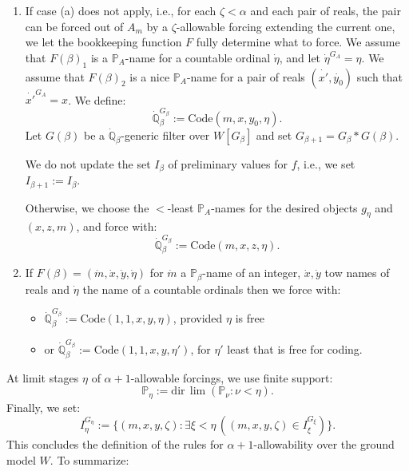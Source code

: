 \documentclass[a4paper,11pt]{article}
\newcommand{\forceP}{\mathbb{P}}
\newcommand{\forceQ}{\mathbb{Q}}
\begin{document}
\begin{enumerate}
\item[(b)] If case (a) does not apply, i.e., for each \( \zeta < \alpha \) and each pair of reals, the pair can be forced out of \( A_m \) by a \( \zeta \)-allowable forcing extending the current one, we let the bookkeeping function \( F \) fully determine what to force. We assume that \( F(\beta)_1 \) is a \( \forceP_A \)-name for a countable ordinal \( \dot{\eta} \), and let \( \dot{\eta}^{G_A} = \eta \). We assume that \( F(\beta)_2 \) is a nice \( \forceP_A \)-name for a pair of reals \( (\dot{x'}, \dot{y_0}) \) such that \( \dot{x'}^{G_A} = x \). We define:
  \[
  \dot{\forceQ}_{\beta}^{G_{\beta}} := \text{Code}(m,x,y_0,\eta).
  \]
  Let \( G(\beta) \) be a \( \dot{\forceQ}_{\beta} \)-generic filter over \( W[G_{\beta}] \) and set \( G_{\beta+1} = G_{\beta} \ast G(\beta) \).

  We do not update the set \( I_{\beta} \) of preliminary values for \( f \), i.e., we set \( I_{\beta+1} := I_{\beta} \).

  Otherwise, we choose the \( < \)-least \( \forceP_A \)-names for the desired objects \( g_{\eta} \) and \( (x, z, m) \), and force with:
  \[
  \dot{\forceQ}_{\beta}^{G_{\beta}} := \text{Code}(m,x,z,\eta)
  .
  \]

\item[(c)] If \( F(\beta) = (\dot{m},\dot{x},\dot{y},\dot{\eta}) \) for $\dot{m}$ a \( \forceP_{\beta} \)-name of an integer, $\dot{x},\dot{y}$ tow names of reals and $\dot{\eta}$ the name of a countable ordinals then we force with:

  \begin{itemize}
  \item[] \( \dot{\forceQ}_{\beta}^{G_{\beta}} := \text{Code}(1,1,x,y,\eta)  \), provided \(\eta \) is free
  \item[] or \( \dot{\forceQ}_{\beta}^{G_{\beta}} := \text{Code}(1,1,x,y,
\eta')  \), for $\eta'$ least that is free for coding.
  \end{itemize}

\end{enumerate}

At limit stages \( \eta \) of \( \alpha + 1 \)-allowable forcings, we use finite support:
\[
\forceP_{\eta} := \text{dir} \, \lim (\forceP_{\nu} : \nu < \eta).
\]
Finally, we set:
\[
I_{\eta}^{G_{\eta}} := \{ (m, x, y, \zeta) : \exists \xi < \eta \, ((m, x, y, \zeta) \in I_{\xi}^{G_{\xi}}) \}.
\]
This concludes the definition of the rules for \( \alpha + 1 \)-allowability over the ground model \( W \). To summarize:
\end{document}
